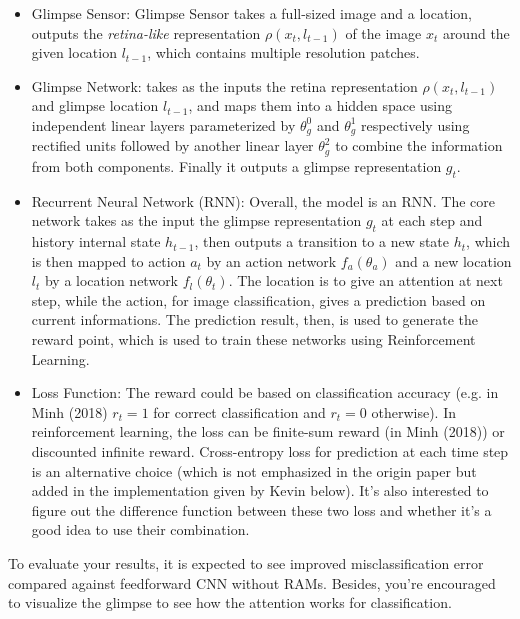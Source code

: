 \documentclass[11pt]{article}
\begin{document}
\begin{itemize}
	\item Glimpse Sensor: Glimpse Sensor takes a full-sized image and a location, outputs the \emph{retina-like} representation $\rho(x_t,l_{t-1})$ of the image $x_t$ around the given location $l_{t-1}$, which contains multiple resolution patches.
	\item Glimpse Network: takes as the inputs the retina representation $\rho(x_t,l_{t-1})$ and glimpse location $l_{t-1}$, and maps them into a hidden space using independent linear layers parameterized by $\theta_g^0$ and $\theta_g^1$ respectively using rectified units followed by another linear layer $\theta^2_g$ to combine the information from both components. Finally it outputs a glimpse representation $g_t$.
	\item Recurrent Neural Network (RNN): Overall, the model is an RNN. The core network takes as the input the glimpse representation $g_t$ at each step and history internal state $h_{t-1}$, then outputs a transition to a new state $h_{t}$, which is then mapped to action $a_t$ by an action network $f_a(\theta_a)$ and a new location $l_t$ by a location network $f_l(\theta_t)$. The location is to give an attention at next step, while the action, for image classification, gives a prediction based on current informations.  The prediction result, then, is used to generate the reward point, which is used to train these networks using Reinforcement Learning. 
	\item Loss Function: The reward could be based on classification accuracy (e.g. in Minh (2018) $r_t=1$ for correct classification and $r_t=0$ otherwise). In reinforcement learning, the loss can be finite-sum reward (in Minh (2018)) or discounted infinite reward. Cross-entropy loss for prediction at each time step is an alternative choice (which is not emphasized in the origin paper but added in the implementation given by Kevin below). It's also interested to figure out the difference function between these two loss and whether it's a good idea to use their combination. \end{itemize}

To evaluate your results, it is expected to see improved misclassification error compared against feedforward CNN without RAMs. Besides, you're encouraged to visualize the glimpse to see how the attention works for classification.
\end{document}
